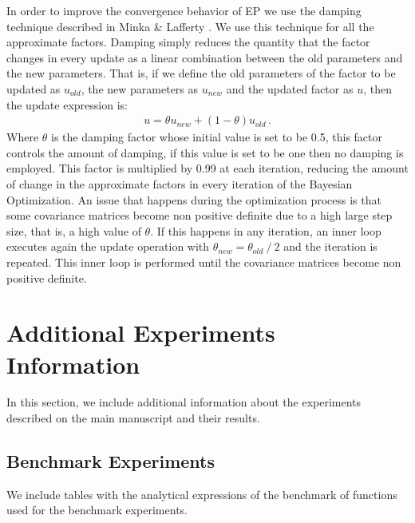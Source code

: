 In order to improve the convergence behavior of EP we use the damping technique described in Minka \& Lafferty \cite{minka2012expectation}. We use this technique for all the approximate factors. Damping simply reduces the quantity that the factor changes in every update as a linear combination between the old parameters and the new parameters. That is, if we define the old parameters of the factor to be updated as $u_{old}$, the new parameters as $u_{new}$ and the updated factor as $u$, then the update expression is:
\begin{align}
    u = \theta u_{new} + (1-\theta)u_{old}\,.
\end{align}
Where $\theta$ is the damping factor whose initial value is set to be 0.5, this factor controls the amount of damping, if this value is set to be one then no damping is employed. This factor is multiplied by 0.99 at each iteration, reducing the amount of change in the approximate factors in every iteration of the Bayesian Optimization. An issue that happens during the optimization process is that some covariance matrices become non positive definite due to a high large step size, that is, a high value of $\theta$. If this happens in any iteration, an inner loop executes again the update operation with $\theta_{new} = \theta_{old}\ /\ 2$ and the iteration is repeated. This inner loop is performed until the covariance matrices become non positive definite.

\section{Additional Experiments Information}
In this section, we include additional information about the experiments described on the main manuscript and their results.

\subsection{Benchmark Experiments}
We include tables with the analytical expressions of the benchmark of functions used for the benchmark experiments.

